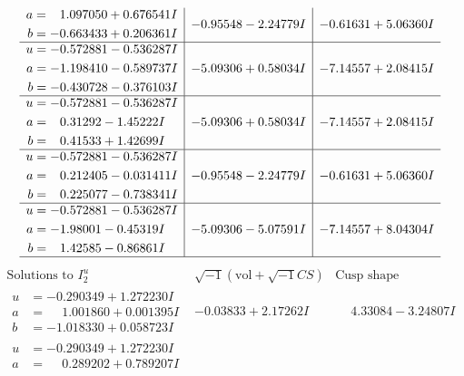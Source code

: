 \documentclass[1p]{elsarticle_modified}
\theoremstyle{definition}
\newcommand{\I}{\sqrt{-1}}
\begin{document}
$$\begin{array}{c|c|c}
\begin{aligned}
a &= \phantom{-}1.097050 + 0.676541 I \\
b &= -0.663433 + 0.206361 I\end{aligned}
 & -0.95548 - 2.24779 I & -0.61631 + 5.06360 I \\ \hline\begin{aligned}
u &= -0.572881 - 0.536287 I \\
a &= -1.198410 - 0.589737 I \\
b &= -0.430728 - 0.376103 I\end{aligned}
 & -5.09306 + 0.58034 I & -7.14557 + 2.08415 I \\ \hline\begin{aligned}
u &= -0.572881 - 0.536287 I \\
a &= \phantom{-}0.31292 - 1.45222 I \\
b &= \phantom{-}0.41533 + 1.42699 I\end{aligned}
 & -5.09306 + 0.58034 I & -7.14557 + 2.08415 I \\ \hline\begin{aligned}
u &= -0.572881 - 0.536287 I \\
a &= \phantom{-}0.212405 - 0.031411 I \\
b &= \phantom{-}0.225077 - 0.738341 I\end{aligned}
 & -0.95548 - 2.24779 I & -0.61631 + 5.06360 I \\ \hline\begin{aligned}
u &= -0.572881 - 0.536287 I \\
a &= -1.98001 - 0.45319 I \\
b &= \phantom{-}1.42585 - 0.86861 I\end{aligned}
 & -5.09306 - 5.07591 I & -7.14557 + 8.04304 I\\
 \hline 
 \end{array}$$\newpage$$\begin{array}{c|c|c}  
\text{Solutions to }I^u_{2}& \I (\text{vol} + \sqrt{-1}CS) & \text{Cusp shape}\\
 \hline 
\begin{aligned}
u &= -0.290349 + 1.272230 I \\
a &= \phantom{-}1.001860 + 0.001395 I \\
b &= -1.018330 + 0.058723 I\end{aligned}
 & -0.03833 + 2.17262 I & \phantom{-}4.33084 - 3.24807 I \\ \hline\begin{aligned}
u &= -0.290349 + 1.272230 I \\
a &= \phantom{-}0.289202 + 0.789207 I \\

\end{aligned}
\end{array}$$
\end{document}
